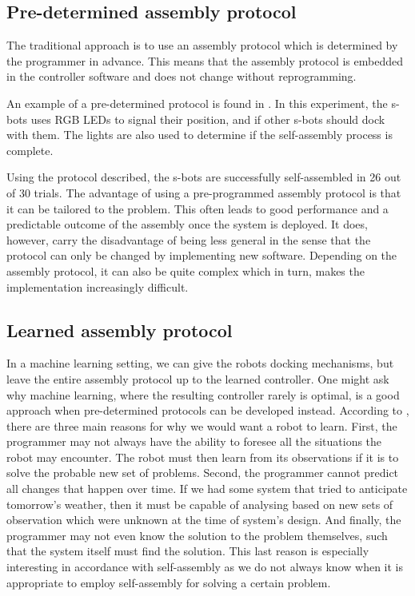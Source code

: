\subsection{Pre-determined assembly protocol}
The traditional approach is to use an assembly protocol which is determined by the programmer in advance.
This means that the assembly protocol is embedded in the controller software and does not change without reprogramming. 

An example of a pre-determined protocol is found in \cite{gross_object_2006}.
In this experiment, the s-bots uses RGB LEDs to signal their position, and if other s-bots should dock with them.
The lights are also used to determine if the self-assembly process is complete. 

Using the protocol described, the s-bots are successfully self-assembled in 26 out of 30 trials. The advantage of using a pre-programmed assembly protocol is that it can be tailored to the problem. This often leads to good performance and a predictable outcome of the assembly once the system is deployed. It does, however, carry the disadvantage of being less general in the sense that the protocol can only be changed by implementing new software. Depending on the assembly protocol, it can also be quite complex which in turn, makes the implementation increasingly difficult.

\subsection{Learned assembly protocol}
In a machine learning setting, we can give the robots docking mechanisms, but leave the entire assembly protocol up to the learned controller.
One might ask why machine learning, where the resulting controller rarely is optimal, is a good approach when pre-determined protocols can be developed instead.
According to \cite{russell_artificial_1995}, there are three main reasons for why we would want a robot to learn.
First, the programmer may not always have the ability to foresee all the situations the robot may encounter.
The robot must then learn from its observations if it is to solve the probable new set of problems.
Second, the programmer cannot predict all changes that happen over time. 
If we had some system that tried to anticipate tomorrow's weather, then it must be capable of analysing based on new sets of observation which were unknown at the time of system's design.
And finally, the programmer may not even know the solution to the problem themselves, such that the system itself must find the solution.
This last reason is especially interesting in accordance with self-assembly as we do not always know when it is appropriate to employ self-assembly for solving a certain problem.

